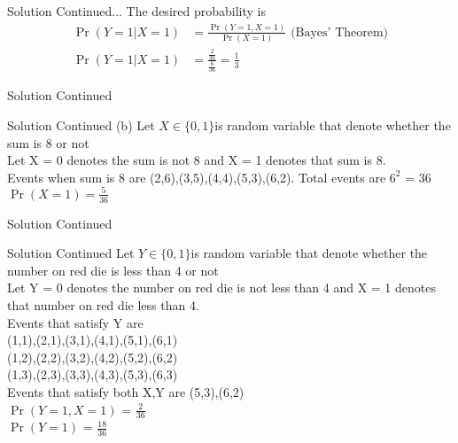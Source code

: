 \documentclass{beamer}
\providecommand{\pr}[1]{\ensuremath{\Pr\left(#1\right)}}
\begin{document}
    \begin{frame}
        \begin{block}{Solution Continued...}
            The desired probability is
            \begin{align}
                \pr{Y=1 | X=1} &= \frac{\pr{Y=1, X=1}}{\pr{X=1}} \text{ (Bayes' Theorem)}\\
                \pr{Y=1 | X=1} &= \frac{\frac{2}{36}}{\frac{6}{36}} = \frac{1}{3}
            \end{align}
            
        \end{block}
    \end{frame}
     \begin{frame}
        \begin{section}{Solution Continued}
            \begin{block}{Solution Continued}
            (b) Let $X \in \{0,1\} $is random variable that denote whether the sum is 8 or not \\Let X = 0 denotes the sum is not 8 and X = 1 denotes that sum is 8.\\
              Events when sum is 8 are (2,6),(3,5),(4,4),(5,3),(6,2).
              Total events are $6^2 $ = 36\\
              $\pr{X=1} = \frac{5}{36}$
            \end{block}
            \end{section}
            \end{frame}
    \begin{frame}
        \begin{section}{Solution Continued}
            \begin{block}{Solution Continued}
             Let $Y \in \{0,1\} $is random variable that denote whether the number on red die is less than 4 or not \\Let Y = 0 denotes the number on red die is not less than 4 and X = 1 denotes that number on red die less than 4.\\
             Events that satisfy Y are \\
             (1,1),(2,1),(3,1),(4,1),(5,1),(6,1)\\
             (1,2),(2,2),(3,2),(4,2),(5,2),(6,2)\\
             (1,3),(2,3),(3,3),(4,3),(5,3),(6,3)\\
             Events that satisfy both X,Y are (5,3),(6,2)\\
             \pr{Y = 1,X = 1} = $\frac{2}{36}$\\
             \pr{Y = 1} = $\frac{18}{36}$
     \end{block}         
    \end{section}
    \end{frame}
\end{document}

